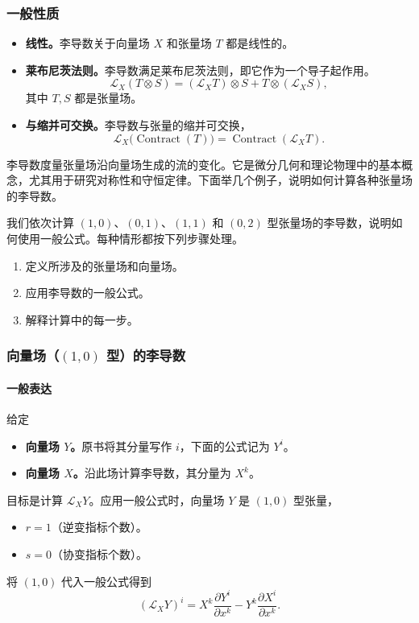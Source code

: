 \subsubsection{一般性质}
\begin{itemize}
  \item \textbf{线性。}李导数关于向量场 $X$ 和张量场 $T$ 都是线性的。
  \item \textbf{莱布尼茨法则。}李导数满足莱布尼茨法则，即它作为一个导子起作用。
  \[
    \mathcal L_X(T\otimes S)=(\mathcal L_X T)\otimes S+T\otimes(\mathcal L_X S),
  \]
  其中 $T,S$ 都是张量场。
  \item \textbf{与缩并可交换。}李导数与张量的缩并可交换，
  \[
    \mathcal L_X\bigl(\operatorname{Contract}(T)\bigr)
        =\operatorname{Contract}(\mathcal L_X T).
  \]
\end{itemize}

李导数度量张量场沿向量场生成的流的变化。它是微分几何和理论物理中的基本概念，尤其用于研究对称性和守恒定律。下面举几个例子，说明如何计算各种张量场的李导数。

我们依次计算 $(1,0)$、$(0,1)$、$(1,1)$ 和 $(0,2)$ 型张量场的李导数，说明如何使用一般公式。每种情形都按下列步骤处理。
\begin{enumerate}
  \item 定义所涉及的张量场和向量场。
  \item 应用李导数的一般公式。
  \item 解释计算中的每一步。
\end{enumerate}

\subsubsection{向量场（$(1,0)$ 型）的李导数}
\paragraph{一般表达}
给定
\begin{itemize}
  \item \textbf{向量场 $Y$。}原书将其分量写作 $i$，下面的公式记为 $Y^i$。
  \item \textbf{向量场 $X$。}沿此场计算李导数，其分量为 $X^k$。
\end{itemize}
目标是计算 $\mathcal L_X Y$。应用一般公式时，向量场 $Y$ 是 $(1,0)$ 型张量，
\begin{itemize}
  \item $r=1$（逆变指标个数）。
  \item $s=0$（协变指标个数）。
\end{itemize}
将 $(1,0)$ 代入一般公式得到
\[
  (\mathcal L_X Y)^i=X^k\frac{\partial Y^i}{\partial x^k}
             -Y^k\frac{\partial X^i}{\partial x^k}.
\]

